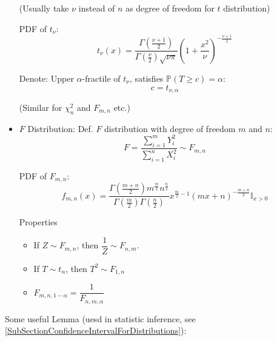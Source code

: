 \begin{itemize}
            (Usually take $\nu$ instead of $n$ as degree of freedom for $ t $ distribution)

            PDF of $t_\nu$:
            \begin{equation}        
                t_\nu(x)=\dfrac{\Gamma(\frac{\nu+1}{2})}{\Gamma(\frac{\nu}{2})\sqrt{\nu\pi}}\left(1+\frac{x^2}{\nu}\right)^{-\frac{\nu+1}{2}}
            \end{equation}

            Denote: Upper $\alpha$-fractile of $t_\nu$, satisfies $\mathbb{P}(T\geq c)=\alpha$:
            \begin{equation}        
                c=t_{\nu,\alpha}
            \end{equation}
            
            (Similar for $\chi^2_n$ and $F_{m,n}$ etc.)
            \item $F$ Distribution: Def. $F$ distribution with degree of freedom $m$ and $n$:
            \begin{equation}        
                F=\frac{\sum_{i=1}^mY_i^2}{\sum_{i=1}^nX_i^2}\sim F_{m,n}
            \end{equation}

            PDF of $F_{m,n}$:
            \begin{equation}        
                f_{m,n}(x)=\frac{\Gamma(\frac{m+n}{2})m^\frac{m}{2}n^{\frac{n}{2}}}{\Gamma(\frac{m}{2})\Gamma(\frac{n}{2})}x^{\frac{m}{2}-1}(mx+n)^{-\frac{m+n}{2}} \mathbb{I}_{x>0}
            \end{equation}

            Properties
            \begin{itemize}
                \item If $Z\sim F_{m,n}$, then $\dfrac{1}{Z}\sim F_{n,m}$.
                \item If $T\sim t_n$, then $T^2\sim F_{1,n}$
                \item $F_{m,n,1-\alpha}=\dfrac{1}{F_{n,m,\alpha}}$
            \end{itemize}
        \end{itemize}

        \begin{point}
            Some useful Lemma (uesd in statistic inference, see \autoref{SubSectionConfidenceIntervalForDistributions}):
        \end{point}
        
